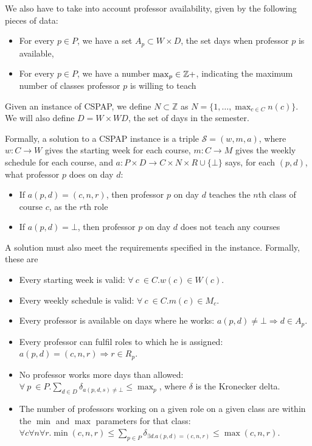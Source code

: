 We also have to take into account professor availability, given by the following pieces of data:
\begin{itemize}
\item For every $p \in P$, we have a set $A_p \subset W \times D$, the set days when professor $p$ is available,
\item For every $p \in P$, we have a number $\max_p \in \mathbb{Z}+$, indicating the maximum number of classes professor $p$ is willing to teach
\end{itemize}

Given an instance of CSPAP, we define $N \subset \mathbb{Z}$ as $N = \{1, \dots, \max_{c \in C} n(c)\}$. We will also define $D = W \times WD$, the set of days in the semester.

Formally, a solution to a CSPAP instance is a triple $\mathcal{S} = (w, m, a)$, where $w: C \to W$ gives the starting week for each course, $m: C \to M$ gives the weekly schedule for each course, and $a: P \times D \to C \times N \times R \cup \{\bot\}$ says, for each $(p, d)$, what professor $p$ does on day $d$:
\begin{itemize}
\item If $a(p, d) = (c, n, r)$, then professor $p$ on day $d$ teaches the $n$th class of course $c$, as the $r$th role
\item If $a(p, d) = \bot$, then professor $p$ on day $d$ does not teach any courses
\end{itemize}

A solution must also meet the requirements specified in the instance. Formally, these are

\begin{itemize}
\item Every starting week is valid: $\forall\ c\ \in C. w(c) \in W(c)$.
\item Every weekly schedule is valid: $\forall\ c\ \in C. m(c) \in M_c$.
\item Every professor is available on days where he works: $a(p, d) \ne \bot \Rightarrow d \in A_p$.
\item Every professor can fulfil roles to which he is assigned: $a(p, d) = (c, n, r) \Rightarrow r \in R_p$.
\item No professor works more days than allowed: $\forall\ p\ \in P. \sum_{d \in D} \delta_{a(p, d, s) \ne \bot} \le \max_p$, where $\delta$ is the Kronecker delta.
\item The number of professors working on a given role on a given class are within the $\min$ and $\max$ parameters for that class: $\forall c \forall n \forall r. \min(c, n, r) \le \sum_{p \in P} \delta_{\exists d. a(p, d) = (c, n, r)} \le \max(c, n, r)$.
\end{itemize}

